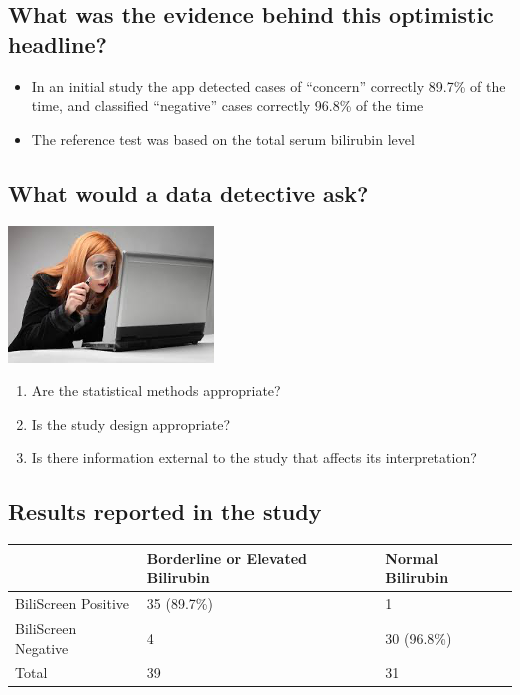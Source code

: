 \documentclass[
]{book}
\providecommand{\tightlist}{%
  \setlength{\itemsep}{0pt}\setlength{\parskip}{0pt}}
\begin{document}
\hypertarget{what-was-the-evidence-behind-this-optimistic-headline}{%
\subsection{What was the evidence behind this optimistic headline?}\label{what-was-the-evidence-behind-this-optimistic-headline}}

\begin{itemize}
\tightlist
\item
  In an initial study the app detected cases of ``concern'' correctly 89.7\% of the time, and classified ``negative'' cases correctly 96.8\% of the time
\item
  The reference test was based on the total serum bilirubin level
\end{itemize}

\hypertarget{what-would-a-data-detective-ask}{%
\subsection{What would a data detective ask?}\label{what-would-a-data-detective-ask}}

\includegraphics[width=0.5\linewidth]{./1_11}

\begin{enumerate}
\def\labelenumi{\arabic{enumi}.}
\tightlist
\item
  Are the statistical methods appropriate?
\item
  Is the study design appropriate?
\item
  Is there information external to the study that affects its interpretation?
\end{enumerate}

\hypertarget{results-reported-in-the-study}{%
\subsection{Results reported in the study}\label{results-reported-in-the-study}}

\begin{tabular}{l|l|l}
\hline
  & Borderline or Elevated Bilirubin & Normal Bilirubin\\
\hline
BiliScreen Positive & 35 (89.7\%) & 1\\
\hline
BiliScreen Negative & 4 & 30 (96.8\%)\\
\hline
Total & 39 & 31\\
\hline
\end{tabular}
\end{document}
